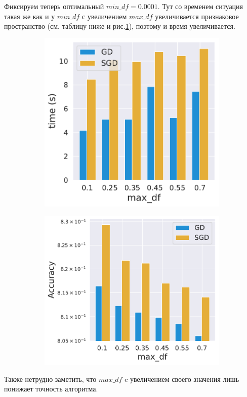 \begin{enumerate}
	Фиксируем теперь оптимальный $min\_df = 0.0001$. Тут со временем ситуация такая же как и у $min\_df$ с увеличением $max\_df$ увеличивается признаковое пространство (см. таблицу ниже и рис.\ref{eq:exp5_fig3}), поэтому и время увеличивается. 
	\begin{figure}[h]
        \begin{subfigure}{.5\textwidth}
            \centering
            \includegraphics[width=0.9\linewidth]{./experiment5/maxdf_time.pdf}
            \caption{}
        \end{subfigure}
        \begin{subfigure}{.5\textwidth}
            \centering
            \includegraphics[width=\linewidth]{./experiment5/maxdf_acc.pdf}
            \caption{}
        \end{subfigure}
    \caption{}\label{eq:exp5_fig3}
    \end{figure}
	Также нетрудно заметить, что $max\_df$ c увеличением своего значения лишь понижает точность алгоритма.
\end{enumerate}

